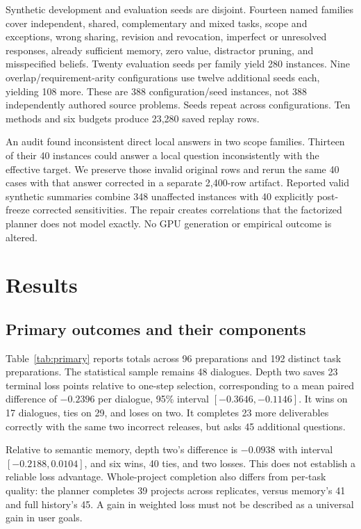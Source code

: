 \documentclass[11pt]{article}
\begin{document}
Synthetic development and evaluation seeds are disjoint. Fourteen named families cover independent, shared, complementary and mixed tasks, scope and exceptions, wrong sharing, revision and revocation, imperfect or unresolved responses, already sufficient memory, zero value, distractor pruning, and misspecified beliefs. Twenty evaluation seeds per family yield 280 instances. Nine overlap/requirement-arity configurations use twelve additional seeds each, yielding 108 more. These are 388 configuration/seed instances, not 388 independently authored source problems. Seeds repeat across configurations. Ten methods and six budgets produce 23,280 saved replay rows.

An audit found inconsistent direct local answers in two scope families. Thirteen of their 40 instances could answer a local question inconsistently with the effective target. We preserve those invalid original rows and rerun the same 40 cases with that answer corrected in a separate 2,400-row artifact. Reported valid synthetic summaries combine 348 unaffected instances with 40 explicitly post-freeze corrected sensitivities. The repair creates correlations that the factorized planner does not model exactly. No GPU generation or empirical outcome is altered.

\section{Results}
\subsection{Primary outcomes and their components}
Table~\ref{tab:primary} reports totals across 96 preparations and 192 distinct task preparations. The statistical sample remains 48 dialogues. Depth two saves 23 terminal loss points relative to one-step selection, corresponding to a mean paired difference of $-0.2396$ per dialogue, 95\% interval $[-0.3646,-0.1146]$. It wins on 17 dialogues, ties on 29, and loses on two. It completes 23 more deliverables correctly with the same two incorrect releases, but asks 45 additional questions.

Relative to semantic memory, depth two's difference is $-0.0938$ with interval $[-0.2188,0.0104]$, and six wins, 40 ties, and two losses. This does not establish a reliable loss advantage. Whole-project completion also differs from per-task quality: the planner completes 39 projects across replicates, versus memory's 41 and full history's 45. A gain in weighted loss must not be described as a universal gain in user goals.
\end{document}
